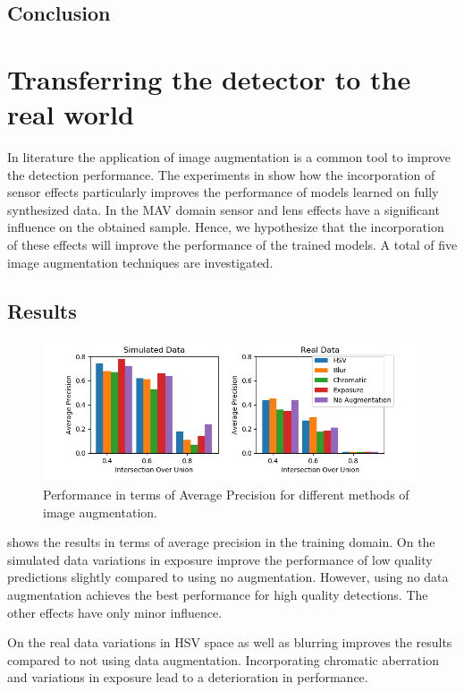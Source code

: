 \subsection{Conclusion}

\section{Transferring the detector to the real world}


In literature \cite{Krizhevsky2012a,Howard2013,Redmon,Liu} the application of image augmentation is a common tool to improve the detection performance. The experiments in \cite{Carlson2018} show how the incorporation of sensor effects particularly improves the performance of models learned on fully synthesized data. In the \ac{MAV} domain sensor and lens effects have a significant influence on the obtained sample. Hence, we hypothesize that the incorporation of these effects will improve the performance of the trained models. A total of  five image augmentation techniques are investigated.

\subsection{Results}

\begin{figure}[htbp]
	\centering
	\includegraphics[width=\textwidth]{fig/pp_bar}
	\caption{Performance in terms of Average Precision for different methods  of image augmentation.}
	\label{fig:pp_bar}
\end{figure}

 shows the results in terms of average precision in the training domain. On the simulated data variations in exposure improve the performance of low quality predictions slightly compared to using no augmentation. However, using no data augmentation achieves the best performance for high quality detections. The other effects have only minor influence. 

On the real data variations in HSV space as well as blurring improves the results compared to not using data augmentation. Incorporating chromatic aberration and variations in exposure lead to a deterioration in performance.

